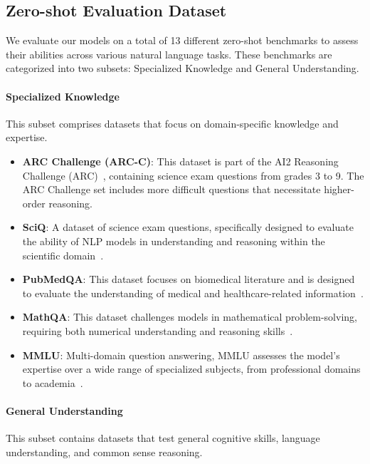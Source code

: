\subsection{Zero-shot Evaluation Dataset}
We evaluate our models on a total of 13 different zero-shot benchmarks to assess their abilities across various natural language tasks. These benchmarks are categorized into two subsets: Specialized Knowledge and General Understanding.

\paragraph{Specialized Knowledge}
This subset comprises datasets that focus on domain-specific knowledge and expertise.

\begin{itemize}
\item \textbf{ARC Challenge (ARC-C)}: This dataset is part of the AI2 Reasoning Challenge (ARC)~\citep{allenai:arc}, containing science exam questions from grades 3 to 9. The ARC Challenge set includes more difficult questions that necessitate higher-order reasoning.
\item \textbf{SciQ}: A dataset of science exam questions, specifically designed to evaluate the ability of NLP models in understanding and reasoning within the scientific domain~\citep{SciQ}.
\item \textbf{PubMedQA}: This dataset focuses on biomedical literature and is designed to evaluate the understanding of medical and healthcare-related information~\citep{jin2019pubmedqa}.
\item \textbf{MathQA}: This dataset challenges models in mathematical problem-solving, requiring both numerical understanding and reasoning skills~\citep{amini-etal-2019-mathqa}.
\item \textbf{MMLU}: Multi-domain question answering, MMLU assesses the model's expertise over a wide range of specialized subjects, from professional domains to academia~\citep{hendryckstest2021}.
\end{itemize}

\paragraph{General Understanding}
This subset contains datasets that test general cognitive skills, language understanding, and common sense reasoning.

